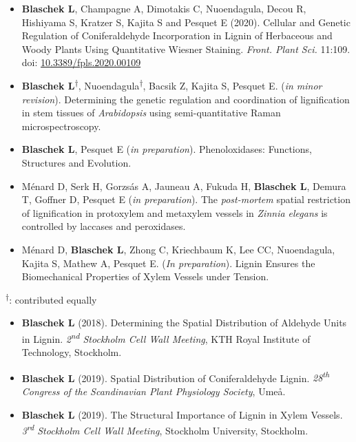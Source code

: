 \documentclass[11pt]{article}
\begin{document}
\vspace{-0.175cm}
\begin{itemize}[label={},itemindent=-9pt,leftmargin=24pt]
	\itemsep-0.1cm
	\item \textbf{Blaschek L}, Champagne A, Dimotakis C, Nuoendagula, Decou R, Hishiyama S, Kratzer S, Kajita S and Pesquet E (2020). Cellular and Genetic Regulation of Coniferaldehyde Incorporation in Lignin of Herbaceous and Woody Plants Using Quantitative Wiesner Staining. \textit{Front. Plant Sci.} 11:109. doi: \href{https://doi.org/10.3389/fpls.2020.00109}{10.3389/fpls.2020.00109}
	\item \textbf{Blaschek L}\textsuperscript{$\dagger$}, Nuoendagula\textsuperscript{$\dagger$}, Bacsik Z, Kajita S, Pesquet E. (\textit{in minor revision}). Determining the genetic regulation and coordination of lignification in stem tissues of \textit{Arabidopsis} using semi-quantitative Raman microspectroscopy.
	\item \textbf{Blaschek L}, Pesquet E (\textit{in preparation}). Phenoloxidases: Functions, Structures and Evolution.
	\item Ménard D, Serk H, Gorzsás A, Jauneau A, Fukuda H, \textbf{Blaschek L}, Demura T, Goffner D, Pesquet E (\textit{in preparation}). The \textit{post-mortem} spatial restriction of lignification in protoxylem and metaxylem vessels in \textit{Zinnia elegans} is controlled by laccases and peroxidases.
	\item Ménard D, \textbf{Blaschek L}, Zhong C, Kriechbaum K, Lee CC, Nuoendagula, Kajita S, Mathew A, Pesquet E. (\textit{In preparation}). Lignin Ensures the Biomechanical Properties of Xylem Vessels under Tension.
\end{itemize}

\textsuperscript{$\dagger$}: contributed equally
\vspace{0.3cm}

\vspace{-0.175cm}
\begin{itemize}[label={},itemindent=-9pt,leftmargin=24pt]
	\itemsep-0.1cm
	\item \textbf{Blaschek L} (2018). Determining the Spatial Distribution of Aldehyde Units in Lignin. \textit{2\textsuperscript{nd} Stockholm Cell Wall Meeting}, KTH Royal Institute of Technology, Stockholm.
	\item \textbf{Blaschek L} (2019). Spatial Distribution of Coniferaldehyde Lignin. \textit{28\textsuperscript{th} Congress of the Scandinavian Plant Physiology Society}, Umeå.
	\item \textbf{Blaschek L} (2019). The Structural Importance of Lignin in Xylem Vessels. \textit{3\textsuperscript{rd} Stockholm Cell Wall Meeting}, Stockholm University, Stockholm.
\end{itemize}
\vspace{0.3cm}
\end{document}
